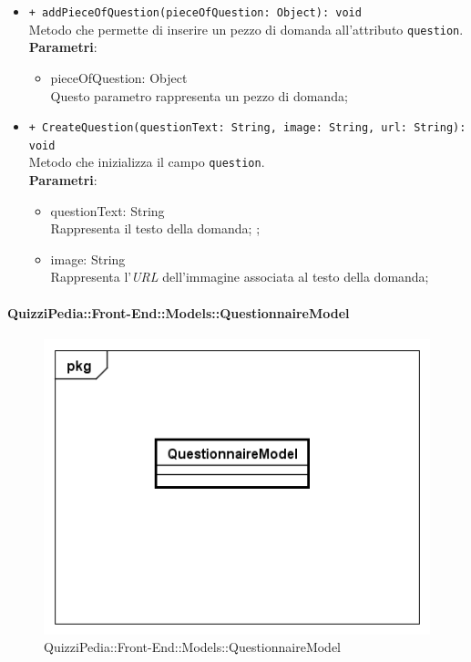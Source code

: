 \begin{itemize}
\begin{itemize}
				\item \texttt{+ addPieceOfQuestion(pieceOfQuestion: Object): void} \\
				Metodo che permette di inserire un pezzo di domanda all'attributo \texttt{question}.\\
				\textbf{Parametri}:
				\begin{itemize}
					\item {pieceOfQuestion: Object}\\
					Questo parametro rappresenta un pezzo di domanda;
				\end{itemize}
				
				\item \texttt{+ CreateQuestion(questionText: String, image: String, url: String): void} \\
				Metodo che inizializza il campo \texttt{question}.\\
				\textbf{Parametri}:
				\begin{itemize}
					\item {questionText: String}\\
					Rappresenta il testo della domanda; ;
					\item {image: String}\\
					Rappresenta l'\textit{URL} dell'immagine associata al testo della domanda; 
				\end{itemize}	
			\end{itemize}
		\end{itemize}
		
		\paragraph{QuizziPedia::Front-End::Models::QuestionnaireModel}
		
		\label{QuizziPedia::Front-End::Models::QuestionnaireModel}
		
		\begin{figure}[ht]
			\centering
			\includegraphics[scale=0.5,keepaspectratio]{UML/Classi/Front-End/QuizziPedia_Front-end_Models_QuestionnaireModel.png}
			\caption{QuizziPedia::Front-End::Models::QuestionnaireModel}
		\end{figure} \FloatBarrier
		
